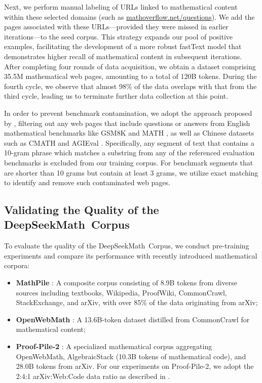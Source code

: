 Next, we perform manual labeling of URLs linked to mathematical content within these selected domains (such as \url{mathoverflow.net/questions}). We add the pages associated with these URLs—provided they were missed in earlier iterations—to the seed corpus. This strategy expands our pool of positive examples, facilitating the development of a more robust fastText model that demonstrates higher recall of mathematical content in subsequent iterations. After completing four rounds of data acquisition, we obtain a dataset comprising 35.5M mathematical web pages, amounting to a total of 120B tokens. During the fourth cycle, we observe that almost 98\% of the data overlaps with that from the third cycle, leading us to terminate further data collection at this point.

In order to prevent benchmark contamination, we adopt the approach proposed by \cite{deepseek-coder}, filtering out any web pages that include questions or answers from English mathematical benchmarks like GSM8K \citep{gsm8k} and MATH \citep{MATH}, as well as Chinese datasets such as CMATH \citep{wei2023cmath} and AGIEval \citep{agieval}. Specifically, any segment of text that contains a 10-gram phrase which matches a substring from any of the referenced evaluation benchmarks is excluded from our training corpus. For benchmark segments that are shorter than 10 grams but contain at least 3 grams, we utilize exact matching to identify and remove such contaminated web pages.

\subsection{Validating the Quality of the DeepSeekMath~Corpus}

To evaluate the quality of the DeepSeekMath~Corpus, we conduct pre-training experiments and compare its performance with recently introduced mathematical corpora:

\begin{itemize}[topsep=0pt]
    \item \textbf{MathPile} \citep{mathpile}: A composite corpus consisting of 8.9B tokens from diverse sources including textbooks, Wikipedia, ProofWiki, CommonCrawl, StackExchange, and arXiv, with over 85\% of the data originating from arXiv;
    \item \textbf{OpenWebMath} \citep{openwebmath}: A 13.6B-token dataset distilled from CommonCrawl for mathematical content;
    \item \textbf{Proof-Pile-2} \citep{llemma}: A specialized mathematical corpus aggregating OpenWebMath, AlgebraicStack (10.3B tokens of mathematical code), and 28.0B tokens from arXiv. For our experiments on Proof-Pile-2, we adopt the 2:4:1 arXiv:Web:Code data ratio as described in \cite{llemma}.
\end{itemize}

